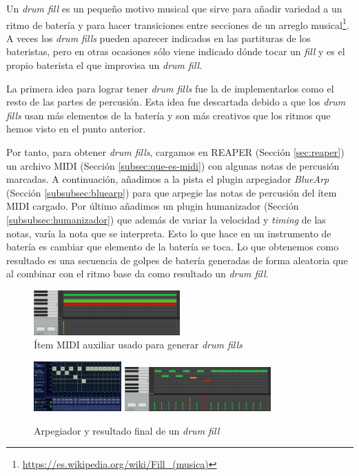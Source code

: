     Un \textit{drum fill} es un pequeño motivo musical que sirve para añadir variedad a un ritmo de batería y para hacer transiciones entre secciones de un arreglo musical\footnote{\url{https://es.wikipedia.org/wiki/Fill_(musica)}}. A veces los \textit{drum fills} pueden aparecer indicados en las partituras de los bateristas, pero en otras ocasiones sólo viene indicado dónde tocar un \textit{fill} y es el propio baterista el que improvisa un \textit{drum fill}.
    
    La primera idea para lograr tener \textit{drum fills} fue la de implementarlos como el resto de las partes de percusión. Esta idea fue descartada debido a que los \textit{drum fills} usan más elementos de la batería y son más creativos que los ritmos que hemos visto en el punto anterior.

    Por tanto, para obtener \textit{drum fills}, cargamos en REAPER (Sección \ref{sec:reaper}) un archivo MIDI (Sección \ref{subsec:que-es-midi}) con algunas notas de percusión marcadas. A continuación, añadimos a la pista el plugin arpegiador \textit{BlueArp} (Sección \ref{subsubsec:bluearp}) para que arpegie las notas de percusión del ítem MIDI cargado. Por último añadimos un plugin humanizador (Sección \ref{subsubsec:humanizador}) que además de variar la velocidad y \textit{timing} de las notas, varía la nota que se interpreta. Esto lo que hace en un instrumento de batería es cambiar que elemento de la batería se toca. Lo que obtenemos como resultado es una secuencia de golpes de batería generadas de forma aleatoria que al combinar con el ritmo base da como resultado un \textit{drum fill}.

    \begin{figure}[h]
        \centering
        \includegraphics[width = 0.5\textwidth]{Imagenes/Bitmap/FillTemplate.png}
        \caption{Ítem MIDI auxiliar usado para generar \textit{drum fills}}
        \label{fig:FillTemplate}
    \end{figure}
    
    \begin{figure}[h]
        \centering
        \includegraphics[width = 0.3\textwidth]{Imagenes/Bitmap/FillArp.png}
        \includegraphics[width = 0.5\textwidth]{Imagenes/Bitmap/FillResult.png}
        \caption{Arpegiador y resultado final de un \textit{drum fill}}
        \label{fig:FillResult}
    \end{figure}

